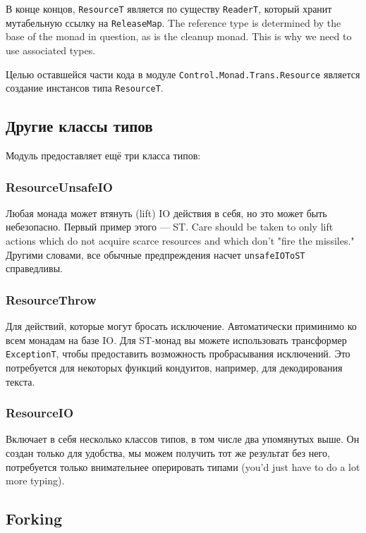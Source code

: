 В конце концов, \lstinline'ResourceT' является по существу \lstinline'ReaderT', который
хранит мутабельную
ссылку на \lstinline'ReleaseMap'. The reference type is determined by the base
of the monad in question, as is the cleanup monad. This is why we need to use associated
types. 

Целью оставшейся части кода в модуле \lstinline'Control.Monad.Trans.Resource'
является создание инстансов типа \lstinline'ResourceT'.

\subsection{Другие классы типов}

Модуль предоставляет ещё три класса типов:
   
\subsubsection{ResourceUnsafeIO}
Любая монада может втянуть (lift) IO действия в себя, но это может быть небезопасно.
Первый пример этого --- ST. Care should be taken to
only lift actions which do not acquire scarce resources and which don't "fire the
missiles."  Другими словами, все обычные предпреждения насчет \lstinline'unsafeIOToST'
справедливы.
  
\subsubsection{ResourceThrow}

Для действий, которые могут бросать исключение. Автоматически приминимо ко всем
монадам на базе IO. Для ST-монад вы можете использовать трансформер
\lstinline'ExceptionT', чтобы
предоставить возможность пробрасывания исключений. Это потребуется для некоторых функций
кондуитов, например, для декодирования текста.
   
\subsubsection{ResourceIO}

Включает в себя несколько классов типов, в том числе два
упомянутых выше. Он создан только для удобства, мы можем получить тот же результат без
него, потребуется только внимательнее оперировать типами (you'd just have to do a lot
more typing).
   
\subsection{Forking}

